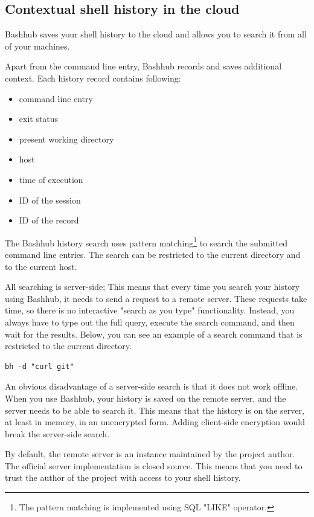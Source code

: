 \subsection{Contextual shell history in the cloud}


Bashhub\cite{toolsbashhubclient} saves your shell history to the cloud and allows you to search it from all of your machines.

Apart from the command line entry, Bashhub records and saves additional context. Each history record contains following:
\begin{itemize}
    \item command line entry
    \item exit status
    \item present working directory
    \item host
    \item time of execution
    \item ID of the session
    \item ID of the record
\end{itemize}

The Bashhub history search uses pattern matching\footnote{The pattern matching is implemented using SQL "LIKE" operator.} to search the submitted command line entries. The search can be restricted to the current directory and to the current host.


All searching is server-side; This means that every time you search your history using Bashhub, it needs to send a request to a remote server.
These requests take time, so there is no interactive "search as you type" functionality. Instead, you always have to type out the full query, execute the search command, and then wait for the results. Below, you can see an example of a search command that is restricted to the current directory. 

\begin{verbatim}
bh -d "curl git"
\end{verbatim}

An obvious disadvantage of a server-side search is that it does not work offline. 
When you use Bashhub, your history is saved on the remote server, and the server needs to be able to search it. This means that the history is on the server, at least in memory, in an unencrypted form. Adding client-side encryption would break the server-side search.

By default, the remote server is an instance maintained by the project author. The official server implementation is closed source. This means that you need to trust the author of the project with access to your shell history. 

